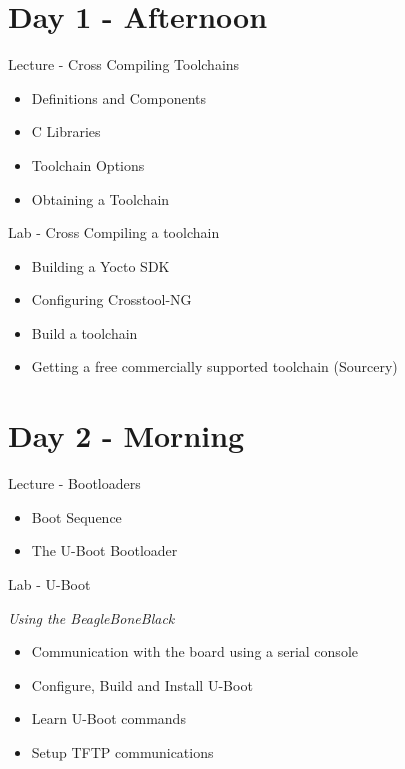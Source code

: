 \documentclass[a4paper,12pt,obeyspaces,spaces,hyphens]{article}
\begin{document}
\section{Day 1 - Afternoon}
\feagendatwocolumn
{Lecture - Cross Compiling Toolchains}
{
  \begin{itemize}
  \item Definitions and Components
  \item C Libraries
  \item Toolchain Options
  \item Obtaining a Toolchain
  \end{itemize}
}
{Lab - Cross Compiling a toolchain}
{
  \begin{itemize}
  \item Building a Yocto SDK
  \item Configuring Crosstool-NG
  \item Build a toolchain
  \item Getting a free commercially supported toolchain (Sourcery)
 \end{itemize}
}
\clearpage
\section{Day 2 - Morning}
\feagendatwocolumn
{Lecture - Bootloaders}
{
  \begin{itemize}
  \item Boot Sequence
  \item The U-Boot Bootloader
  \end{itemize}
}
{Lab - U-Boot}
{
  {\em Using the BeagleBoneBlack}
  \begin{itemize}
  \item Communication with the board using a serial console
  \item Configure, Build and Install U-Boot
  \item Learn U-Boot commands
  \item Setup TFTP communications
  \end{itemize}
}
\end{document}
